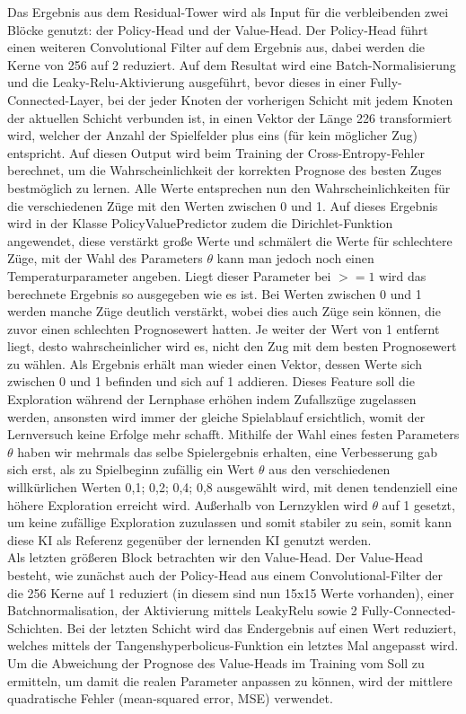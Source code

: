 \documentclass[12pt,a4paper]{article}
\begin{document}
Das Ergebnis aus dem Residual-Tower wird als Input für die verbleibenden zwei Blöcke genutzt: der Policy-Head und der Value-Head. Der Policy-Head führt einen weiteren Convolutional Filter auf dem Ergebnis aus, dabei werden die Kerne von 256 auf 2 reduziert. Auf dem Resultat  wird eine Batch-Normalisierung und die Leaky-Relu-Aktivierung ausgeführt, bevor dieses in einer Fully-Connected-Layer, bei der jeder Knoten der vorherigen Schicht mit jedem Knoten der aktuellen Schicht verbunden ist, in einen Vektor der Länge 226 transformiert wird, welcher der Anzahl der Spielfelder plus eins (für kein möglicher Zug) entspricht. Auf diesen Output wird beim Training der Cross-Entropy-Fehler berechnet, um die Wahrscheinlichkeit der korrekten Prognose des besten Zuges bestmöglich zu lernen. Alle Werte entsprechen nun den Wahrscheinlichkeiten für die verschiedenen Züge mit den Werten zwischen 0 und 1. Auf dieses Ergebnis wird in der Klasse PolicyValuePredictor zudem die Dirichlet-Funktion angewendet, diese verstärkt große Werte und schmälert die Werte für schlechtere Züge, mit der Wahl des Parameters $\theta$ kann man jedoch noch einen Temperaturparameter angeben. Liegt dieser Parameter bei $>= 1$ wird das berechnete Ergebnis so ausgegeben wie es ist. Bei Werten zwischen 0 und 1 werden manche Züge deutlich verstärkt, wobei dies auch Züge sein können, die zuvor einen schlechten Prognosewert hatten. Je weiter der Wert von 1 entfernt liegt, desto wahrscheinlicher wird es, nicht den Zug mit dem besten Prognosewert zu wählen. Als Ergebnis erhält man wieder einen Vektor, dessen Werte sich zwischen 0 und 1 befinden und sich auf 1 addieren. Dieses Feature soll die Exploration während der Lernphase erhöhen indem Zufallszüge zugelassen werden, ansonsten wird immer der gleiche Spielablauf ersichtlich, womit der Lernversuch keine Erfolge mehr schafft. Mithilfe der Wahl eines festen Parameters $\theta$ haben wir mehrmals das selbe Spielergebnis erhalten, eine Verbesserung gab sich erst, als zu Spielbeginn zufällig ein Wert  $\theta$ aus den verschiedenen willkürlichen Werten {0,1; 0,2; 0,4; 0,8} ausgewählt wird, mit denen tendenziell eine höhere Exploration erreicht wird. Außerhalb von Lernzyklen wird $\theta$ auf 1 gesetzt, um keine zufällige Exploration zuzulassen und somit stabiler zu sein, somit kann diese KI als Referenz gegenüber der lernenden KI genutzt werden. \\
Als letzten größeren Block betrachten wir den Value-Head. Der Value-Head besteht, wie zunächst auch der Policy-Head aus einem Convolutional-Filter der die 256 Kerne auf 1 reduziert (in diesem sind nun 15x15 Werte vorhanden), einer Batchnormalisation, der Aktivierung mittels LeakyRelu sowie 2 Fully-Connected-Schichten. Bei der letzten Schicht wird das Endergebnis auf einen Wert reduziert, welches mittels der Tangenshyperbolicus-Funktion ein letztes Mal angepasst wird. Um die Abweichung der Prognose des Value-Heads im Training vom Soll zu ermitteln, um damit die realen Parameter anpassen zu können, wird der mittlere quadratische Fehler (mean-squared error, MSE) verwendet. 
\end{document}

